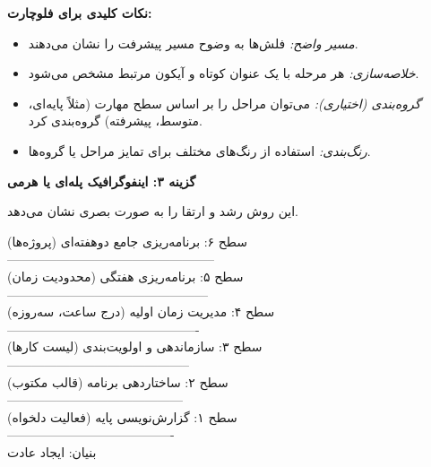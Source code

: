 \documentclass{article}
\begin{document}
\vspace{2ex} %

\noindent\textbf{نکات کلیدی برای فلوچارت:}

\begin{itemize}
    \item \textit{مسیر واضح:} فلش‌ها به وضوح مسیر پیشرفت را نشان می‌دهند.
    \item \textit{خلاصه‌سازی:} هر مرحله با یک عنوان کوتاه و آیکون مرتبط مشخص می‌شود.
    \item \textit{گروه‌بندی (اختیاری):} می‌توان مراحل را بر اساس سطح مهارت (مثلاً پایه‌ای، متوسط، پیشرفته) گروه‌بندی کرد.
    \item \textit{رنگ‌بندی:} استفاده از رنگ‌های مختلف برای تمایز مراحل یا گروه‌ها.
\end{itemize}

\vspace{4ex} %
\newpage
\noindent\textbf{گزینه ۳: اینفوگرافیک پله‌ای یا هرمی}

\vspace{1ex} %
این روش رشد و ارتقا را به صورت بصری نشان می‌دهد.
\vspace{2ex} %

\begin{flushright} %
سطح ۶: برنامه‌ریزی جامع دوهفته‌ای (پروژه‌ها) \\
-------------------------------------------------- \\
سطح ۵: برنامه‌ریزی هفتگی (محدودیت زمان) \\
------------------------------------------------ \\
سطح ۴: مدیریت زمان اولیه (درج ساعت، سه‌روزه) \\
---------------------------------------------- \\
سطح ۳: سازماندهی و اولویت‌بندی (لیست کارها) \\
-------------------------------------------- \\
سطح ۲: ساختاردهی برنامه (قالب مکتوب) \\
------------------------------------------ \\
سطح ۱: گزارش‌نویسی پایه (فعالیت دلخواه) \\
---------------------------------------- \\
بنیان: ایجاد عادت \\
\end{flushright}
\end{document}
